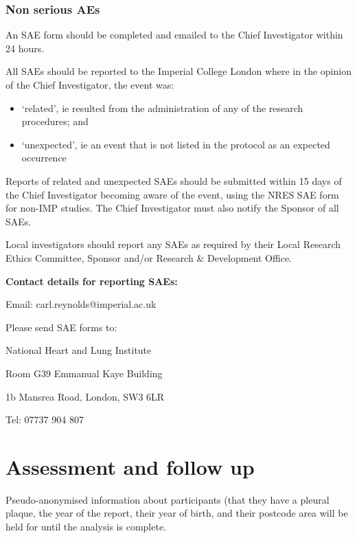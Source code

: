 \documentclass[a4paper,10pt]{article}
\begin{document}
\subsubsection{Non serious AEs}
An SAE form should be completed and emailed to the Chief Investigator within 24 hours. 

All SAEs should be reported to the Imperial College London where in the opinion of the Chief Investigator, the event was: \begin{itemize}
                                                                                                                           \item ‘related’, ie resulted from the administration of any of the research procedures; and
					   \item ‘unexpected’, ie an event that is not listed in the protocol as an expected occurrence
                                                                                                                         \end{itemize}

Reports of related and unexpected SAEs should be submitted within 15 days of the Chief Investigator becoming aware of the event, using the NRES SAE form for non-IMP studies. The Chief Investigator must also notify the Sponsor of all SAEs.

Local investigators should report any SAEs as required by their Local Research Ethics Committee, Sponsor and/or Research \& Development Office.

\begin{center}
\textbf{Contact details for reporting SAEs:}
 
Email: carl.reynolds@imperial.ac.uk

Please send SAE forms to: 

National Heart and Lung Institute

Room G39 Emmanual Kaye Building

1b Mansrea Road, London, SW3 6LR 

Tel: 07737 904 807

\end{center}


\section{Assessment and follow up}
Pseudo-anonymised information about participants (that they have a pleural plaque, the year of the report, their year of birth, and their postcode area will be held for until the analysis is complete. 
\end{document}
